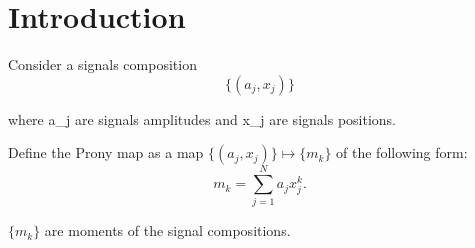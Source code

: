 \section{Introduction}
Consider a signals composition
$$
\{ (a_j, x_j) \}
$$

where a_j are signals amplitudes and x_j are signals positions. \par

Define the Prony map as a map $\{ (a_j, x_j) \} \mapsto \{m_k\}$ of the following form:
$$
m_k = \sum_{j=1}^N a_j x_j^k.
$$
  
$\{m_k\}$ are moments of the signal compositions.
  
  
  
  
  
  
  
